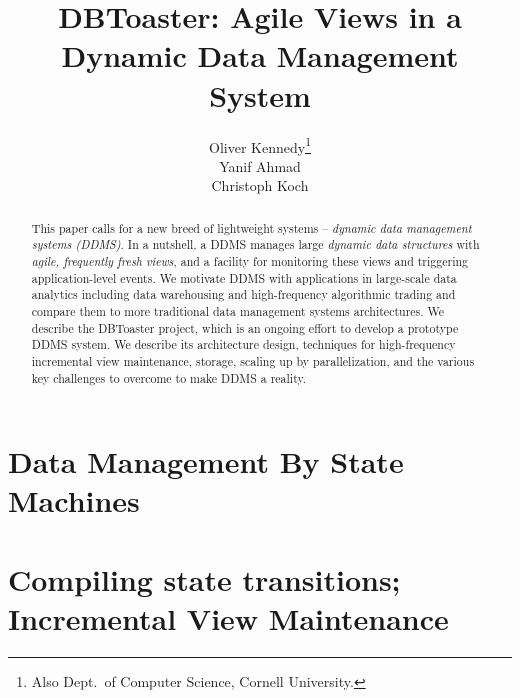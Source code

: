 \documentclass{sig-alternate}
\begin{document}
\title{DBToaster: Agile Views in a\\Dynamic Data Management System}
\author{
\alignauthor
Oliver Kennedy\thanks{Also Dept.\ of Computer Science, Cornell University.}\\
\alignauthor
Yanif Ahmad\\
\alignauthor
Christoph Koch\\
}
\maketitle

\begin{abstract}
This paper calls for a new breed of lightweight systems --
{\em dynamic data management systems (DDMS)}\/.
In a nutshell,
a DDMS manages large {\em dynamic data structures}\/ with 
{\em agile, frequently fresh views}\/, and a facility for monitoring
these views and triggering application-level events.
%
We motivate DDMS with applications in large-scale data analytics
including data warehousing and high-frequency algorithmic trading
and compare them to more traditional data management systems 
architectures.
%
We describe the DBToaster project, which is an ongoing effort to
develop a prototype DDMS system. We describe its architecture
design, techniques for high-frequency incremental view maintenance,
storage, scaling up by parallelization, and
the various key challenges to overcome to make DDMS a reality.
\end{abstract}



\section{Data Management By State Machines}

\label{sec:overview}


\section{Compiling state transitions; Incremental View Maintenance}
\label{sec:dbtoaster}

\end{document}

